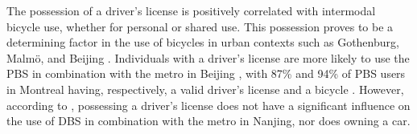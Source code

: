 \begin{refsegment}
The possession of a driver's license is positively correlated with intermodal bicycle use, whether for personal or shared use. This possession proves to be a determining factor in the use of bicycles in urban contexts such as Gothenburg, Malmö, and Beijing \textcolor{blue}{\autocite[7]{hamidi_shaping_2020}}. Individuals with a driver's license are more likely to use the \acrshort{PBS} in combination with the metro in Beijing \textcolor{blue}{\autocite[215]{lin_built_2018}}, with 87\% and 94\% of \acrshort{PBS} users in Montreal having, respectively, a valid driver's license and a bicycle \textcolor{blue}{\autocite[111]{bachand-marleau_much-anticipated_2011}}. However, according to \textcolor{blue}{\textcite[11]{liu_use_2020}}, possessing a driver's license does not have a significant influence on the use of \acrshort{DBS} in combination with the metro in Nanjing, nor does owning a car.%


\end{refsegment}
